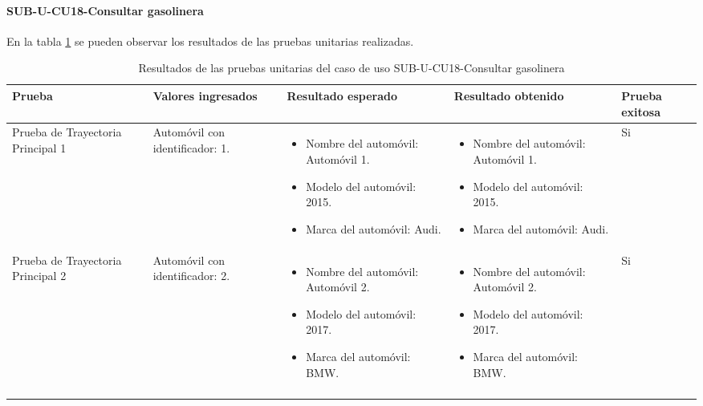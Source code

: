 \paragraph{SUB-U-CU18-Consultar gasolinera}\label{SUB-U-CU18:Pruebas}
En la tabla \ref{pruebas_unitarias_sub-u-cu18} se pueden observar los resultados de las pruebas unitarias realizadas.
\begin{longtable}{|M{2cm}| M{4.5cm}|M{3cm}|M{3cm}|M{1.5cm}|}
	\hline
	\textbf{Prueba} & \textbf{Valores ingresados} & \textbf{Resultado esperado} & \textbf{Resultado obtenido} & \textbf{Prueba exitosa} \\ \hline
	Prueba de Trayectoria Principal 1 & 
	Automóvil con identificador: 1.
	& 
	\begin{itemize}
		\item Nombre del automóvil: Automóvil 1.
		\item Modelo del automóvil: 2015.
		\item Marca del automóvil: Audi.
	\end{itemize}
	&
	\begin{itemize}
		\item Nombre del automóvil: Automóvil 1.
		\item Modelo del automóvil: 2015.
		\item Marca del automóvil: Audi.
	\end{itemize}
	& Si \\ \hline

	Prueba de Trayectoria Principal 2 & 
	Automóvil con identificador: 2.
	& 
	\begin{itemize}
		\item Nombre del automóvil: Automóvil 2.
		\item Modelo del automóvil: 2017.
		\item Marca del automóvil: BMW.
	\end{itemize}
	&
	\begin{itemize}
		\item Nombre del automóvil: Automóvil 2.
		\item Modelo del automóvil: 2017.
		\item Marca del automóvil: BMW.
	\end{itemize}
	& Si \\ \hline

	\caption{Resultados de las pruebas unitarias del caso de uso SUB-U-CU18-Consultar gasolinera}
	\label{pruebas_unitarias_sub-u-cu18}
\end{longtable}